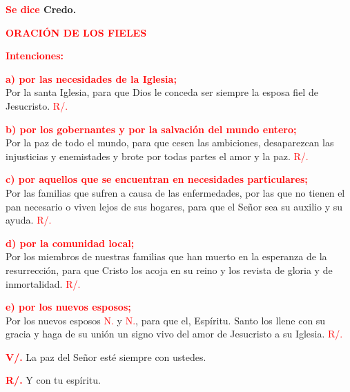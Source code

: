 \documentclass[12pt, letterpaper]{report}
\begin{document}
  \Large {\bfseries \textcolor{red}{Se dice} Credo.}

  \Large {\bfseries \textcolor{red}{ORACI\'ON DE LOS FIELES}}

  \large {\bfseries \textcolor{red}{Intenciones:}}

  \large {\bfseries \textcolor{red}{a) por las necesidades de la Iglesia;}}\\
  \Large Por la santa Iglesia, para que Dios le conceda ser siempre la esposa fiel de Jesucristo. \hspace{1cm} \textcolor{red}{R/.}

  \large {\bfseries \textcolor{red}{b) por los gobernantes y por la salvaci\'on del mundo entero;}}\\
  \Large Por la paz de todo el mundo, para que cesen las ambiciones, desaparezcan las injusticias y enemistades y brote por todas partes el amor y la paz. \hspace{1cm} \textcolor{red}{R/.}

  \large {\bfseries \textcolor{red}{c) por aquellos que se encuentran en necesidades particulares;}}\\
  \Large Por las familias que sufren a causa de las enfermedades, por las que no tienen el pan necesario o viven lejos de sus hogares, para que el Se\~nor sea su auxilio y su ayuda. \hspace{1cm} \textcolor{red}{R/.}

  \large {\bfseries \textcolor{red}{d) por la comunidad local;}}\\
  \Large Por los miembros de nuestras familias que han muerto en la esperanza de la resurrecci\'on, para que Cristo los acoja en su reino y los revista de gloria y de inmortalidad. \hspace{1cm} \textcolor{red}{R/.}

  \large {\bfseries \textcolor{red}{e) por los nuevos esposos;}}\\
  \Large Por los nuevos esposos \textcolor{red}{N.} y \textcolor{red}{N.}, para que el, Esp\'iritu. Santo los llene con su gracia y haga de su uni\'on un signo vivo del amor de Jesucristo a su Iglesia. \hspace{1cm} \textcolor{red}{R/.}

  \Large \hspace{-0.9cm} {\bfseries \textcolor{red}{V/.}} \hspace{0.5cm} La paz del Se\~nor est\'e siempre con ustedes.

  \Large \hspace{-0.9cm} {\bfseries \textcolor{red}{R/.}} \hspace{0.5cm} Y con tu esp\'iritu.
\end{document}
